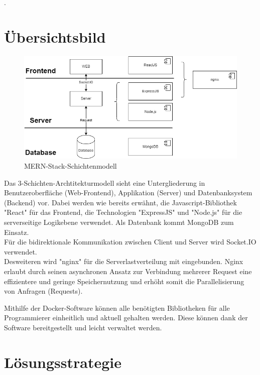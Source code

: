 \documentclass[conference]{IEEEtran}
\begin{document}
\begin{itemize}
\begin{itemize}
\end{itemize}
.

\section{Übersichtsbild}



\begin{figure}[htbp]
\centering
\includegraphics[scale=0.35]{MERN.png}
\caption{MERN-Stack-Schichtenmodell}%
\end{figure}
\begin{itemize}
Das 3-Schichten-Archtitekturmodell sieht eine Untergliederung in Benutzeroberfläche (Web-Frontend), Applikation (Server) und Datenbanksystem (Backend) vor. Dabei werden wie bereits erwähnt, die Javascript-Bibliothek "React" für das Frontend, die Technologien "ExpressJS" und "Node.js" für die serverseitige Logikebene verwendet. Als Datenbank kommt MongoDB zum Einsatz.
\\
Für die bidirektionale Kommunikation zwischen Client und Server wird Socket.IO verwendet.
\\
Desweiteren wird "nginx" für die Serverlastverteilung mit eingebunden. Nginx erlaubt durch seinen asynchronen Ansatz zur Verbindung mehrerer Request eine effizientere und geringe Speichernutzung und erhöht somit die Parallelisierung von Anfragen (Requests).

Mithilfe der Docker-Software können alle benötigten  Bibliotheken für alle Programmierer einheitlich und aktuell gehalten werden. Diese können dank der Software bereitgestellt und leicht verwaltet werden.

\end{itemize}

\section{Lösungsstrategie}


\end{itemize}
\end{document}
